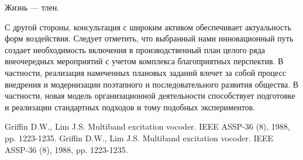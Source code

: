 \documentclass[a4paper,article,14pt]{extarticle}
\begin{document}
Жизнь --- тлен.
\pagebreak


С другой стороны, консультация с широким активом обеспечивает актуальность форм воздействия. Следует отметить, что выбранный нами инновационный путь создает необходимость включения в производственный план целого ряда внеочередных мероприятий с учетом комплекса благоприятных перспектив. В частности, реализация намеченных плановых заданий влечет за собой процесс внедрения и модернизации поэтапного и последовательного развития общества. В частности, новая модель организационной деятельности способствует подготовке и реализации стандартных подходов и тому подобных экспериментов.

\begin{thebibliography}{1}
 Griffin D.W., Lim J.S. \flqq Multiband excitation vocoder\frqq. IEEE ASSP-36 (8), 1988, pp. 1223-1235.
 Griffin D.W., Lim J.S. \flqq Multiband excitation vocoder\frqq. IEEE ASSP-36 (8), 1988, pp. 1223-1235.
\end{thebibliography}
\end{document}
